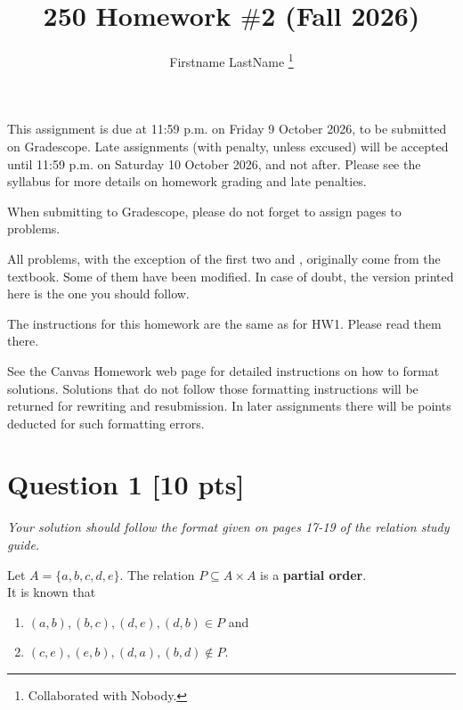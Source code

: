 \documentclass[12pt]{article}
\title{250 Homework $\#$2 (Fall  2026)}
\author{Firstname LastName \footnote{Collaborated with Nobody.}}
\begin{document}
\date{}
\maketitle

This assignment is due at 11:59 p.m. on Friday 9 October 2026, to 
be submitted on Gradescope.  Late assignments (with penalty, unless
excused) will be accepted until
11:59 p.m. on Saturday 10 October 2026, and not after.  Please see
the syllabus for more details on homework grading and late penalties.

\medskip

When submitting to Gradescope, please do not forget to assign pages to problems.

\medskip


All problems, with the exception of the first two and ,  originally come from the textbook. Some of them have been modified.  In case of doubt, the version printed here is the one you should follow.

\bigskip


The instructions for this homework are the same as for HW1.  Please read them there.



\bigskip


See the Canvas Homework web page for detailed instructions on how to format solutions.  Solutions that do not follow those formatting instructions  will be returned for rewriting and resubmission. In later assignments there will be points deducted for such formatting errors.  
 

\newpage

\section*{\textbf{Question 1} [10 pts]}
{\em \small Your solution should follow the format given on  pages 17-19 of the relation study guide.}


  Let $A =\{a,b,c,d,e\}$.  The relation $P \subseteq A \times A$ is a {\bf partial order}.\\
It is known that 
\begin{enumerate}
\item  $(a,b),(b,c),(d,e), (d,b)\in P$ and
\item $(c,e), (e,b),(d,a),(b,d) \not\in P.$
\end{enumerate}
\end{document}
